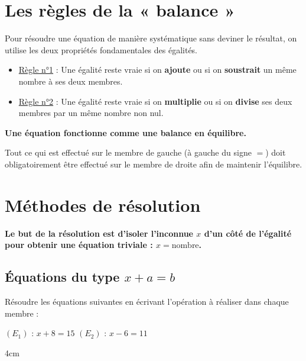 \documentclass[a4paper]{book}
\begin{document}
    
\section{Les règles de la « balance »}
    Pour résoudre une équation de manière systématique sans deviner le résultat, on utilise les deux propriétés fondamentales des égalités.
    
    
    \begin{propriete}
        \begin{itemize}
            \item \underline{Règle n°1} : Une égalité reste vraie si on \textbf{ajoute} ou si on \textbf{soustrait} un même nombre à ses deux membres.
            \item \underline{Règle n°2} : Une égalité reste vraie si on \textbf{multiplie} ou si on \textbf{divise} ses deux membres par un même nombre non nul.
        \end{itemize}  
    \end{propriete}

    
    \begin{remarque}
        \textbf{Une équation fonctionne comme une balance en équilibre.}
        
        Tout ce qui est effectué sur le membre de gauche (à gauche du signe $=$) doit obligatoirement être effectué sur le membre de droite afin de maintenir l'équilibre.
    \end{remarque}
    

\newpage


\section{Méthodes de résolution}
    \textbf{Le but de la résolution est d'isoler l'inconnue $x$ d'un côté de l'égalité pour obtenir une équation triviale : $x = \text{nombre}$.}
    
    
\subsection{Équations du type $x + a = b$}
    \begin{exemple}
        Résoudre les équations suivantes en écrivant l'opération à réaliser dans chaque membre :
        
        $(E_1)$ : $x + 8 = 15$ \hspace{2cm} $(E_2)$ : $x - 6 = 11$
        \begin{ZoneReponse}{4cm}
        \end{ZoneReponse}
    \end{exemple}
    
\end{document}
